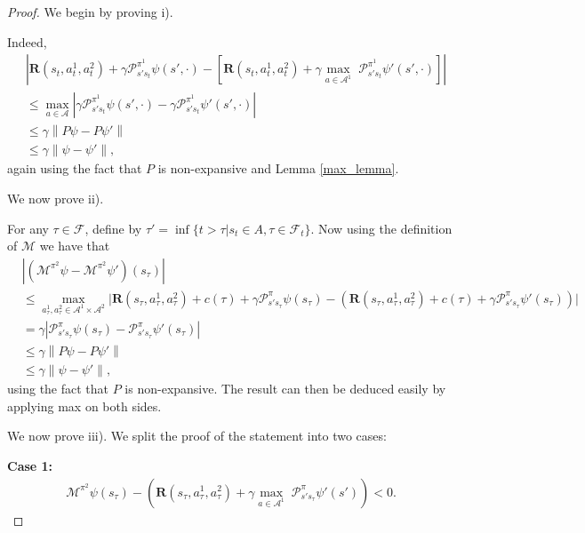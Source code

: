 \documentclass[12pt]{article}
\newtheorem{proof}{Proof}
\begin{document}
\begin{proof}
We begin by proving i).

Indeed, 
\begin{align*}
&\left| \boldsymbol{R}(s_t,a^1_t,a^2_t)+\gamma\mathcal{P}^{\pi^1}_{s's_t}\psi(s',\cdot)-\left[ \boldsymbol{R}(s_t,a^1_t,a^2_t)+\gamma\underset{a\in\mathcal{A}^1}{\max}\;\mathcal{P}^{\pi^1}_{s's_t}\psi'(s',\cdot)\right]\right|
\\&\leq \underset{a\in\mathcal{A}}{\max}\left|\gamma\mathcal{P}^{\pi^1}_{s's_t}\psi(s',\cdot)-\gamma\mathcal{P}^{\pi^1}_{s's_t}\psi'(s',\cdot)\right|
\\&\leq \gamma\left\|P\psi-P\psi'\right\|
\\&\leq \gamma\left\|\psi-\psi'\right\|,
\end{align*}
again using the fact that $P$ is non-expansive and Lemma \ref{max_lemma}.

We now prove ii).


For any $\tau\in\mathcal{F}$, define by $\tau'=\inf\{t>\tau|s_t\in A,\tau\in\mathcal{F}_t\}$. Now using the definition of $\mathcal{M}$ we have that
\begin{align*}
&\left|(\mathcal{M}^{\pi^2}\psi-\mathcal{M}^{\pi^2}\psi')(s_{\tau})\right|
\\&\leq \underset{a^1_\tau,a^2_\tau\in \mathcal{A}^1\times \mathcal{A}^2}{\max}    \Bigg|\boldsymbol{R}(s_\tau,a^1_\tau,a^2_\tau)+c(\tau)+\gamma\mathcal{P}^\pi_{s's_\tau}\psi(s_{\tau})-\left(\boldsymbol{R}(s_\tau,a^1_\tau,a^2_\tau)+c(\tau)+\gamma\mathcal{P}^\pi_{s's_\tau}\psi'(s_{\tau})\right)\Bigg| 
\\&= \gamma\left|\mathcal{P}^\pi_{s's_\tau}\psi(s_{\tau})-\mathcal{P}^\pi_{s's_\tau}\psi'(s_{\tau})\right| 
\\&\leq \gamma\left\|P\psi-P\psi'\right\|
\\&\leq \gamma\left\|\psi-\psi'\right\|,
\end{align*}
using the fact that $P$ is non-expansive. The result can then be deduced easily by applying max on both sides.

We now prove iii). We split the proof of the statement into two cases:

\textbf{Case 1:} 
\begin{align}\mathcal{M}^{\pi^2}\psi(s_{\tau})-\left(\boldsymbol{R}(s_\tau,a^1_\tau,a^2_\tau)+\gamma\underset{a\in\mathcal{A}^1}{\max}\;\mathcal{P}^\pi_{s's_\tau}\psi'(s')\right)<0.
\end{align}


\end{proof}
\end{document}
